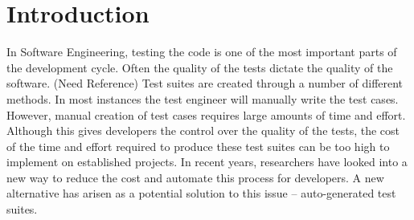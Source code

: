 \documentclass[conference]{IEEEtran}
\begin{document}
\maketitle
\begin{abstract}

\end{abstract}





\section{Introduction}
In Software Engineering, testing the code is one of the most important parts of the development cycle. Often the quality of the tests dictate the quality of the software. (Need Reference) Test suites are created through a number of different methods. In most instances the test engineer will manually write the test cases. However, manual creation of test cases requires large amounts of time and effort. Although this gives developers the control over the quality of the tests, the cost of the time and effort required to produce these test suites can be too high to implement on established projects. In recent years, researchers have looked into a new way to reduce the cost and automate this process for developers. A new alternative has arisen as a potential solution to this issue -- auto-generated test suites. 
\end{document}
